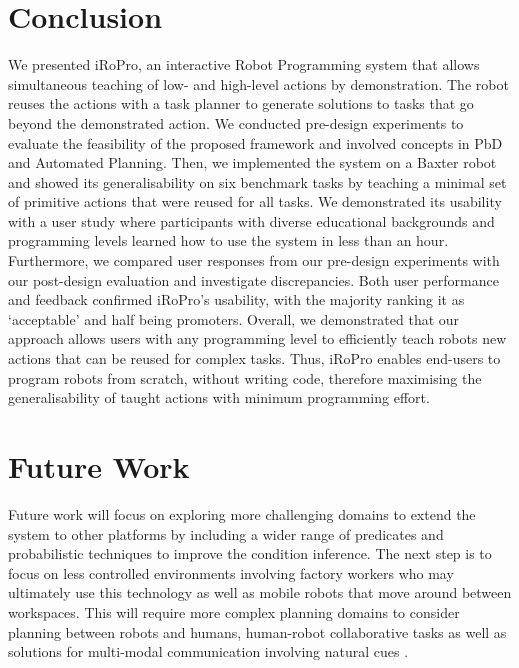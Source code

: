 \section{Conclusion} 
\label{sec:conclusion}
We presented iRoPro, an interactive Robot Programming system that allows simultaneous teaching of low- and high-level actions by demonstration.
The robot reuses the actions with a task planner to generate solutions to tasks that go beyond the demonstrated action.
We conducted pre-design experiments to evaluate the feasibility of the proposed framework and involved concepts in PbD and Automated Planning.
Then, we implemented the system on a Baxter robot and showed its generalisability on six benchmark tasks by teaching a minimal set of primitive actions that were reused for all tasks.
We demonstrated its usability with a user study where participants with diverse educational backgrounds and programming levels learned how to use the system in less than an hour.
Furthermore, we compared user responses from our pre-design experiments with our post-design evaluation and investigate discrepancies.
Both user performance and feedback confirmed iRoPro's usability, with the majority ranking it as `acceptable' and half being promoters.
Overall, we demonstrated that our approach allows users with any programming level to efficiently teach robots new actions that can be reused for complex tasks.
Thus, iRoPro enables end-users to program robots from scratch, without writing code, therefore maximising the generalisability of taught actions with minimum programming effort.

\section{Future Work} 
\label{sec:futurework}
Future work will focus on exploring more challenging domains to extend the system to other platforms by including a wider range of predicates and probabilistic techniques to improve the condition inference.
The next step is to focus on less controlled environments involving factory workers who may ultimately use this technology as well as mobile robots that move around between workspaces.
This will require more complex planning domains to consider planning between robots and humans, human-robot collaborative tasks as well as solutions for multi-modal communication involving natural cues \cite{pais2013assessing}.



